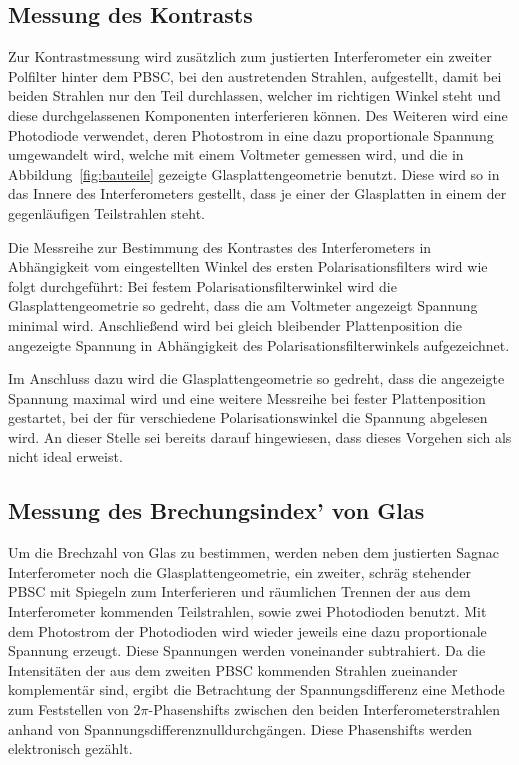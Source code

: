 \subsection{Messung des Kontrasts}
%
Zur Kontrastmessung wird zusätzlich zum justierten Interferometer 
ein zweiter Polfilter hinter dem PBSC, bei den austretenden Strahlen, 
aufgestellt, damit bei beiden Strahlen nur den Teil durchlassen, 
welcher im richtigen Winkel steht und diese durchgelassenen 
Komponenten interferieren können. Des Weiteren wird eine 
Photodiode verwendet, deren Photostrom in eine dazu proportionale 
Spannung umgewandelt wird, welche mit einem Voltmeter gemessen wird, und 
die in Abbildung~\ref{fig:bauteile} gezeigte Glasplattengeometrie 
benutzt. Diese wird so in das Innere des Interferometers gestellt, 
dass je einer der Glasplatten in einem der gegenläufigen Teilstrahlen 
steht.

Die Messreihe zur Bestimmung des Kontrastes des Interferometers 
in Abhängigkeit vom eingestellten Winkel des ersten 
Polarisationsfilters wird wie folgt durchgeführt:
Bei festem Polarisationsfilterwinkel wird die Glasplattengeometrie 
so gedreht, dass die am Voltmeter angezeigt Spannung minimal wird. 
Anschließend wird bei gleich bleibender Plattenposition die 
angezeigte Spannung in Abhängigkeit des Polarisationsfilterwinkels 
aufgezeichnet.

Im Anschluss dazu wird die Glasplattengeometrie so gedreht, dass 
die angezeigte Spannung maximal wird und eine weitere 
Messreihe bei fester Plattenposition gestartet, bei der für 
verschiedene Polarisationswinkel die Spannung abgelesen wird.
An dieser Stelle sei bereits darauf hingewiesen, dass dieses Vorgehen 
sich als nicht ideal erweist.
%
\subsection{Messung des Brechungsindex' von Glas}
%
Um die Brechzahl von Glas zu bestimmen, werden neben dem 
justierten Sagnac Interferometer noch die Glasplattengeometrie, 
ein zweiter, schräg stehender PBSC mit Spiegeln zum Interferieren und 
räumlichen Trennen der aus dem Interferometer kommenden Teilstrahlen, 
sowie zwei Photodioden benutzt. Mit dem Photostrom der 
Photodioden wird wieder jeweils eine dazu proportionale 
Spannung erzeugt. Diese Spannungen werden voneinander subtrahiert. 
Da die Intensitäten der aus dem zweiten 
PBSC kommenden Strahlen zueinander komplementär sind, ergibt die 
Betrachtung der Spannungsdifferenz eine Methode zum Feststellen von 
$2\pi$-Phasenshifts zwischen den beiden Interferometerstrahlen anhand 
von Spannungsdifferenznulldurchgängen. Diese Phasenshifts werden 
elektronisch gezählt.

